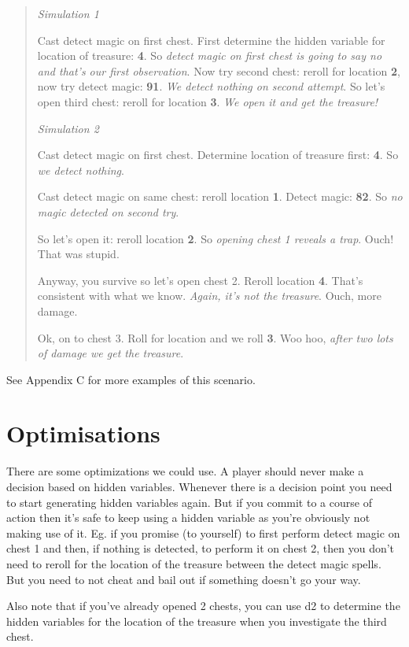 \documentclass[12pt]{article}
\begin{document}
\begin{quote}
\emph{Simulation 1}

Cast detect magic on first chest. First determine the hidden variable
for location of treasure: \textbf{4}. So \emph{detect magic on first
chest is going to say no and that's our first observation}. Now try
second chest: reroll for location \textbf{2}, now try detect magic:
\textbf{91}. \emph{We detect nothing on second attempt}. So let's
open third chest: reroll for location \textbf{3}. \emph{We open it and
get the treasure!}

\emph{Simulation 2}

Cast detect magic on first chest. Determine location of treasure first:
\textbf{4}. So \emph{we detect nothing}.

Cast detect magic on same chest: reroll location \textbf{1}. Detect
magic: \textbf{82}. So \emph{no magic detected on second try}.

So let's open it: reroll location \textbf{2}. So \emph{opening
chest 1 reveals a trap}. Ouch! That was stupid.

Anyway, you survive so let's open chest 2. Reroll location
\textbf{4}. That's consistent with what we know. \emph{Again, it's
not the treasure}. Ouch, more damage.

Ok, on to chest 3. Roll for location and we roll \textbf{3}. Woo hoo,
\emph{after two lots of damage we get the treasure}.
\end{quote}

See Appendix C for more examples of this scenario.

\hypertarget{optimisations}{%
\section{Optimisations}\label{optimisations}}

There are some optimizations we could use.
A player should never
make a decision based on hidden variables. Whenever there is a decision
point you need to start generating hidden variables again. But if you
commit to a course of action then it's safe to keep using a hidden
variable as you're obviously not making use of it.
Eg. if you
promise (to yourself) to first perform detect magic on chest 1 and then,
if nothing is detected, to perform it on chest 2,
then you don't need to reroll for the
location of the treasure between the detect magic spells.
But you need
to not cheat and bail out if something doesn't go your way.

Also note that if you've already opened 2 chests, you can use d2
to determine the hidden variables for the location of the treasure when
you investigate the third chest.
\end{document}
